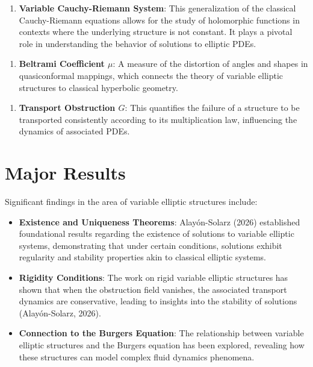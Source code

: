 \documentclass[11pt,a4paper]{article}
\begin{document}
\begin{enumerate}
\item \textbf{Variable Cauchy-Riemann System}: This generalization of the classical Cauchy-Riemann equations allows for the study of holomorphic functions in contexts where the underlying structure is not constant. It plays a pivotal role in understanding the behavior of solutions to elliptic PDEs.
\end{enumerate}

\begin{enumerate}
\item \textbf{Beltrami Coefficient \( \mu \)}: A measure of the distortion of angles and shapes in quasiconformal mappings, which connects the theory of variable elliptic structures to classical hyperbolic geometry.
\end{enumerate}

\begin{enumerate}
\item \textbf{Transport Obstruction \( G \)}: This quantifies the failure of a structure to be transported consistently according to its multiplication law, influencing the dynamics of associated PDEs.
\end{enumerate}

\section{Major Results}

Significant findings in the area of variable elliptic structures include:

\begin{itemize}
\item \textbf{Existence and Uniqueness Theorems}: Alayón-Solarz (2026) established foundational results regarding the existence of solutions to variable elliptic systems, demonstrating that under certain conditions, solutions exhibit regularity and stability properties akin to classical elliptic systems.
\end{itemize}

\begin{itemize}
\item \textbf{Rigidity Conditions}: The work on rigid variable elliptic structures has shown that when the obstruction field vanishes, the associated transport dynamics are conservative, leading to insights into the stability of solutions (Alayón-Solarz, 2026).
\end{itemize}

\begin{itemize}
\item \textbf{Connection to the Burgers Equation}: The relationship between variable elliptic structures and the Burgers equation has been explored, revealing how these structures can model complex fluid dynamics phenomena.
\end{itemize}
\end{document}
